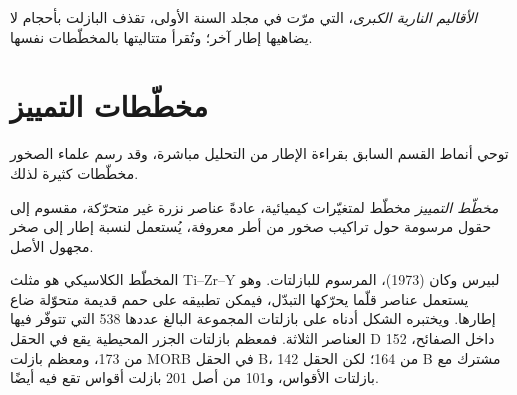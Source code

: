 \emph{الأقاليم النارية الكبرى}، التي مرّت في مجلد السنة الأولى، تقذف البازلت بأحجام
لا يضاهيها إطار آخر؛ وتُقرأ متتاليتها بالمخطّطات نفسها.

\section{مخطّطات التمييز}\label{sec:b2:magmatic-series:discrimination}

توحي أنماط القسم السابق بقراءة الإطار من التحليل
مباشرة، وقد رسم علماء الصخور مخطّطات كثيرة لذلك.

\begin{definition}\label{def:b2:magmatic-series:discrimination}
\emph{مخطّط التمييز} مخطّط لمتغيّرات
كيميائية، عادةً عناصر نزرة غير متحرّكة، مقسوم إلى حقول مرسومة
حول تراكيب صخور من أطر معروفة، يُستعمل لنسبة إطار إلى
صخر مجهول الأصل.
\end{definition}

المخطّط الكلاسيكي هو مثلث Ti--Zr--Y لبيرس وكان (1973)، المرسوم للبازلتات. وهو
يستعمل عناصر قلّما يحرّكها التبدّل، فيمكن تطبيقه على حمم قديمة
متحوّلة ضاع إطارها. ويختبره الشكل أدناه على بازلتات المجموعة البالغ عددها 538
التي تتوفّر فيها العناصر الثلاثة. فمعظم بازلتات الجزر المحيطية يقع في
الحقل D داخل الصفائح، 152 من 173، ومعظم بازلت MORB في الحقل B، 142 من 164؛ لكن الحقل B
مشترك مع بازلتات الأقواس، و101 من أصل 201 بازلت أقواس تقع فيه أيضًا.

